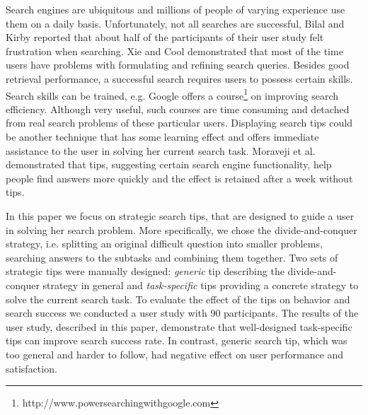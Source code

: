 \documentclass{sig-alternate}
\begin{document}
Search engines are ubiquitous and millions of people of varying experience use them on a daily basis.
Unfortunately, not all searches are successful, Bilal and Kirby \cite{Bilal:2002:DSI:637512.637516} reported that about half of the participants of their user study felt frustration when searching.
Xie and Cool \cite{xie2009understanding} demonstrated that most of the time users have problems with formulating and refining search queries.
Besides good retrieval performance, a successful search requires users to possess certain skills.
Search skills can be trained, e.g. Google offers a course\footnote{http://www.powersearchingwithgoogle.com} on improving search efficiency.
Although very useful, such courses are time consuming and detached from real search problems of these particular users.
Displaying search tips could be another technique that has some learning effect and offers immediate assistance to the user in solving her current search task.
Moraveji et al. \cite{Moraveji:2011:MIU:2009916.2009966} demonstrated that tips, suggesting certain search engine functionality, help people find answers more quickly and the effect is retained after a week without tips.

In this paper we focus on strategic search tips, that are designed to guide a user in solving her search problem.
More specifically, we chose the divide-and-conquer strategy, i.e. splitting an original difficult question into smaller problems, searching answers to the subtasks and combining them together.
Two sets of strategic tips were manually designed: {\em generic} tip describing the divide-and-conquer strategy in general and {\em task-specific} tips providing a concrete strategy to solve the current search task.
To evaluate the effect of the tips on behavior and search success we conducted a user study with 90 participants.
The results of the user study, described in this paper, demonstrate that well-designed task-specific tips can improve search success rate.
In contrast, generic search tip, which was too general and harder to follow, had negative effect on user performance and satisfaction.
\end{document}
